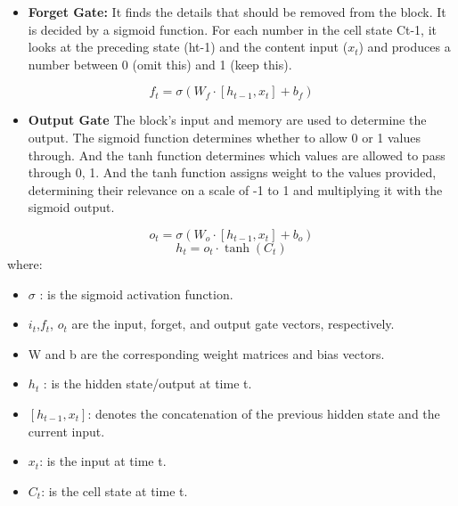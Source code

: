 \documentclass{ieeeojies}
\begin{document}
\begin{itemize}
    \item  \textbf{Forget Gate: }  It finds the details that should be removed from the block. It is decided by a sigmoid function. For each number in the cell state Ct-1, it looks at the preceding state (ht-1) and the content input (\(x_t\)) and produces a number between 0 (omit this) and 1 (keep this).
\end{itemize}
\[f_t = \sigma(W_f \cdot [h_{t-1}, x_t] + b_f)\]
\begin{itemize}
    \item  \textbf{Output Gate }  The block’s input and memory are used to determine the output. The sigmoid function determines whether to allow 0 or 1 values through. And the tanh function determines which values are allowed to pass through 0, 1. And the tanh function assigns weight to the values provided, determining their relevance on a scale of -1 to 1 and multiplying it with the sigmoid output.
\end{itemize}
\[o_t = \sigma(W_o \cdot [h_{t-1}, x_t] + b_o)\]
\[h_t = o_t \cdot \tanh(C_t)\]
where: 
\begin{itemize}
    \item \(\sigma\) : is the sigmoid activation function.
    
\end{itemize}
\begin{itemize}
    \item \(i_t\),\(f_t\), \(o_t\) are the input, forget, and output gate vectors, respectively.  
\end{itemize}
\begin{itemize}
    \item W and b are the corresponding weight matrices and bias vectors.
\end{itemize}
\begin{itemize}
    \item \(h_t\) : is the hidden state/output at time t.
\end{itemize}
\begin{itemize}
    \item \([h_{t-1}, x_t]\): denotes the concatenation of the previous hidden state and the current input.
\end{itemize}
\begin{itemize}
    \item \(x_t\): is the input at time t.
\end{itemize}
\begin{itemize}
    \item \(C_t\): is the cell state at time t.
\end{itemize}
\end{document}
